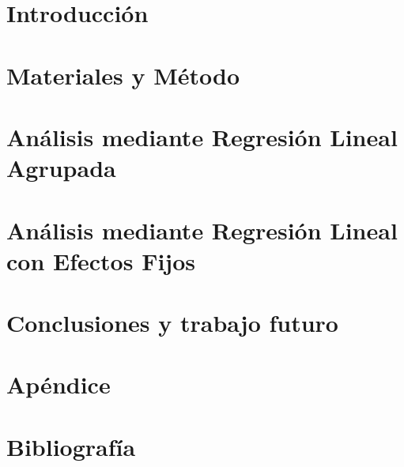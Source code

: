 \documentclass[11pt,a4paper]{tesis}
\begin{document}
\def\titulo{Licenciatura\xspace}

\def\autor{Juan Manuel Pérez}
\def\tituloTesis{Métricas de mimetización acústico-prosódica en hablantes y su relación con rasgos sociales de diálogos}
\def\runtitulo{\tituloTesis}
\def\director{Agustín Gravano}
\def\codirector{Ramiro H. Gálvez}
\def\lugar{Buenos Aires, 2016}




\frontmatter
\pagestyle{empty}




\tableofcontents

\mainmatter
\pagestyle{headings}


\chapter{Introducción}


\chapter{Materiales y Método}


\chapter{Análisis mediante Regresión Lineal Agrupada}


\chapter{Análisis mediante Regresión Lineal con Efectos Fijos}


\chapter{Conclusiones y trabajo futuro}


\chapter{Apéndice}



\chapter{Bibliografía}
\backmatter



\end{document}
